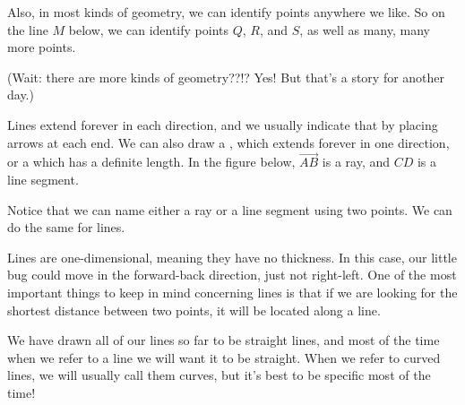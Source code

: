\documentclass{ximera}
\begin{document}
Also, in most kinds of geometry, we can identify points anywhere we like. So on the line $M$ below, we can identify points $Q$, $R$, and $S$, as well as many, many more points. 
\begin{image}
\end{image}
(Wait: there are more kinds of geometry??!? Yes! But that's a story for another day.)

Lines extend forever in each direction, and we usually indicate that by placing arrows at each end. We can also draw a , which extends forever in one direction, or a  which has a definite length. In the figure below, $\overrightarrow{AB}$ is a ray, and $CD$ is a line segment.
\begin{image}
\end{image}
Notice that we can name either a ray or a line segment using two points. We can do the same for lines.

Lines are one-dimensional, meaning they have no thickness. In this case, our little bug could move in the forward-back direction, just not right-left. One of the most important things to keep in mind concerning lines is that if we are looking for the shortest distance between two points, it will be located along a line.

We have drawn all of our lines so far to be straight lines, and most of the time when we refer to a line we will want it to be straight. When we refer to curved lines, we will usually call them curves, but it's best to be specific most of the time!
\end{document}
